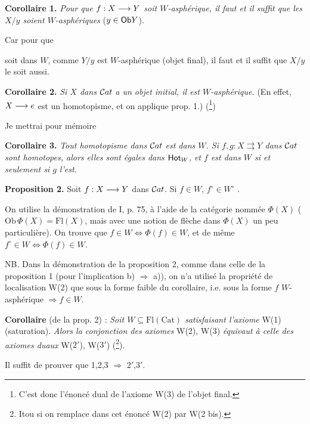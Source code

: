 \textbf{Corollaire 1.} \textit{Pour que $f : X \longrightarrow Y$ soit $W$-asphérique, il faut et il suffit que les $X/y$ soient $W$-asphériques} ($y \in \mathsf{Ob} Y$).

Car pour que
soit dans $W$, comme $Y/y$ est $W$-asphérique (objet final), il faut et il suffit que $X/y$ le soit aussi.

\textbf{Corollaire 2.} \textit{Si $X$ dans} $\mathcal{C}at$ \textit{a un objet initial, il est $W$-asphérique.} (En effet, $X \longrightarrow e$ est un homotopisme, et on applique prop. 1.) (\footnote{C'est donc l'énoncé dual de l'axiome W(3) de l'objet final.})

Je mettrai pour mémoire

\textbf{Corollaire 3.} \textit{Tout homotopisme dans} $\mathcal{C}at$ \textit{est dans $W$. Si $f, g : X \rightrightarrows Y$ dans} $\mathcal{C}at$ \textit{sont homotopes, alors elles sont égales dans} $\mathsf{Hot}_W$\textit{, et $f$ est dans $W$ si et seulement si $g$ l'est.}

\textbf{Proposition 2.} Soit $f : X \longrightarrow Y$ dans $\mathcal{C}at$. Si $f \in W$, $f^\circ \in W^\circ$ .

On utilise la démonstration de I, p. 75, à l'aide de la catégorie nommée $\Phi(X)$ ($\mathrm{Ob}\,\Phi(X) = \mathrm{Fl}(X)$, mais avec une notion de flèche dans $\Phi(X)$ un peu particulière). On trouve que $f \in W \iff \Phi(f) \in W$, et de même $f^\circ \in W \iff \Phi(f) \in W$.

NB. Dans la démonstration de la proposition 2, comme dans celle de la proposition 1 (pour l'implication b) $\Longrightarrow$ a)), on n'a utilisé la propriété de localisation W(2) que sous la forme faible du corollaire, i.e. sous la forme $f$ $W$-asphérique $\Longrightarrow f \in W$.

\textbf{Corollaire} (de la prop. 2) : \textit{Soit $W \subseteq \mathrm{Fl}(\mathrm{Cat})$ satisfaisant l'axiome} W(1) (saturation). \textit{Alors la conjonction des axiomes} W(2), W(3) \textit{équivaut à celle des axiomes duaux} W($2'$), W($3'$) (\footnote[5]{Itou si on remplace dans cet énoncé W(2) par W(2 bis).}).

Il suffit de prouver que 1,2,3 $\Longrightarrow$ $2'$,$3'$.


